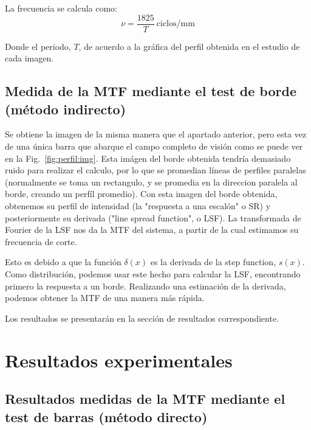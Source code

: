 \documentclass{./packages/optica-article}
\begin{document}
La frecuencia se calcula como:
\nopagebreak
\begin{equation}
	\nu = \frac{1825}{T}\ \textrm{ciclos/mm}\label{eq:frecuencia}
\end{equation}

Donde el periodo, $T$, de acuerdo a la gráfica del perfil obtenida en el estudio de cada imagen.



\subsection{Medida de la MTF mediante el test de borde (método indirecto)}\label{sec:description:indirecto}

Se obtiene la imagen de la misma manera que el apartado anterior, pero esta vez de una única barra que abarque el campo completo de visión como se puede ver en la Fig.~\ref{fig:perfil:img}.
Esta imágen del borde obtenida tendría demasiado ruido para realizar el calculo, por lo que se promedian líneas de perfiles paralelas (normalmente se toma un rectangulo, y se promedia en la direccion paralela al borde, creando un perfíl promedio).
Con esta imagen del borde obtenida, obtenemos su perfil de intensidad (la "respuesta a una escalón" o SR) y posteriormente su derivada ("line spread function", o LSF). La transformada de Fourier de la LSF nos da la MTF del sistema, a partir de la cual estimamos su frecuencia de corte.

Esto es debido a que la función $\delta(x)$ es la derivada de la step function, $s(x)$. Como distribución, podemos usar este hecho para calcular la LSF, encontrando primero la respuesta a un borde. Realizando una estimación de la derivada, podemos obtener la MTF de una manera más rápida.

Los resultados se presentarán en la sección de resultados correspondiente.





\section{Resultados experimentales}\label{sec:resultados}

\subsection{Resultados medidas de la MTF mediante el test de barras (método directo)}\label{sec:mtf-directo}
\end{document}
